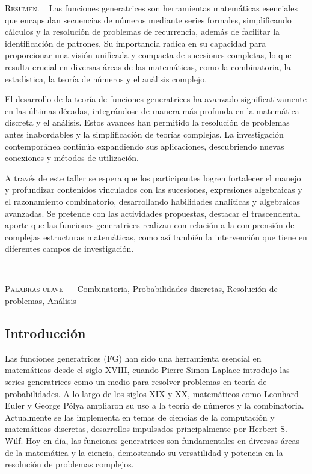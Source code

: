 \begin{center}
	\begin{minipage}{0.75\linewidth} \small
		\textsc{Resumen}. ~
		Las funciones generatrices son herramientas matemáticas esenciales que encapsulan secuencias de números mediante series formales, simplificando cálculos y la resolución de problemas de recurrencia, además de facilitar la identificación de patrones. Su importancia radica en su capacidad para proporcionar una visión unificada y compacta de sucesiones completas, lo que resulta crucial en diversas áreas de las matemáticas, como la combinatoria, la estadística, la teoría de números y el análisis complejo.
		
		El desarrollo de la teoría de funciones generatrices ha avanzado significativamente en las últimas décadas, integrándose de manera más profunda en la matemática discreta y el análisis. Estos avances han permitido la resolución de problemas antes inabordables y la simplificación de teorías complejas. La investigación contemporánea continúa expandiendo sus aplicaciones, descubriendo nuevas conexiones y métodos de utilización.
		
		A través de este taller se espera que los participantes logren fortalecer el manejo y profundizar contenidos vinculados con las sucesiones, expresiones algebraicas y el razonamiento combinatorio, desarrollando habilidades analíticas y algebraicas avanzadas. Se pretende con las actividades propuestas, destacar el trascendental aporte que las funciones generatrices realizan con relación a la comprensión de complejas estructuras matemáticas, como así también la intervención que tiene en diferentes campos de investigación.
	\end{minipage}\\
	
	\vspace{0.5em}
	
	\begin{minipage}{0.75\linewidth} \small
	\textsc{Palabras clave} --- Combinatoria, Probabilidades discretas, Resolución de problemas, Análisis
	\end{minipage}
\end{center}

\subsection{Introducción}

Las funciones generatrices (FG) han sido una herramienta esencial en matemáticas desde el siglo XVIII, cuando Pierre-Simon Laplace introdujo las series generatrices como un medio para resolver problemas en teoría de probabilidades. A lo largo de los siglos XIX y XX, matemáticos como Leonhard Euler y George Pólya ampliaron su uso a la teoría de números y la combinatoria. Actualmente se las implementa en temas de ciencias de la computación y matemáticas discretas, desarrollos impulsados principalmente por Herbert S. Wilf. Hoy en día, las funciones generatrices son fundamentales en diversas áreas de la matemática y la ciencia, demostrando su versatilidad y potencia en la resolución de problemas complejos.

